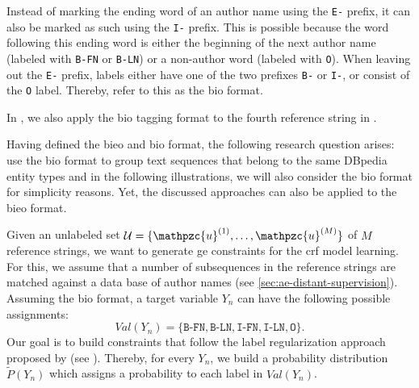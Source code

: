 Instead of marking the ending word of an author name using the \texttt{E-} prefix, it can also be marked as such using the \texttt{I-} prefix.
This is possible because the word following this ending word is either the beginning of the next author name (labeled with \texttt{B-FN} or \texttt{B-LN}) or a non-author word (labeled with \texttt{O}).
When leaving out the \texttt{E-} prefix, labels either have one of the two prefixes \texttt{B-} or \texttt{I-}, or consist of the \texttt{O} label.
Thereby, \citet{houngbo2012method} refer to this as the \gls{bio} format.

In , we also apply the \gls{bio} tagging format to the fourth reference string in .

\bigskip

Having defined the \gls{bieo} and \gls{bio} format, the following research question arises:
\newcommand\researchquestiontwo{}
\researchquestiontwo%
\citet{lu2013web} use the \gls{bio} format to group text sequences that belong to the same DBpedia entity types and in the following illustrations, we will also consider the \gls{bio} format for simplicity reasons.
Yet, the discussed approaches can also be applied to the \gls{bieo} format.

\bigskip

Given an unlabeled set $\mathcal{U}=\{\mathpzc{u}^{(1)},\dots,\mathpzc{u}^{(M)}\}$ of $M$ reference strings, we want to generate \gls{ge} constraints for the \gls{crf} model learning.
For this, we assume that a number of subsequences in the reference strings are matched against a data base of author names (see \cref{sec:ae-distant-supervision}).
Assuming the \gls{bio} format, a \gls{target variable} $Y_n$ can have the following possible assignments:
\begin{equation*}
  \mathit{Val}(Y_n)=\{\texttt{B-FN},\texttt{B-LN},\texttt{I-FN},\texttt{I-LN},\texttt{O}\}.
\end{equation*}
Our goal is to build constraints that follow the \gls{label regularization} approach proposed by \citet{mann2010generalized} (see ).
Thereby, for every $Y_n$, we build a \gls{probability distribution} $\tilde{P}(Y_n)$ which assigns a probability to each label in $\mathit{Val}(Y_n)$.

